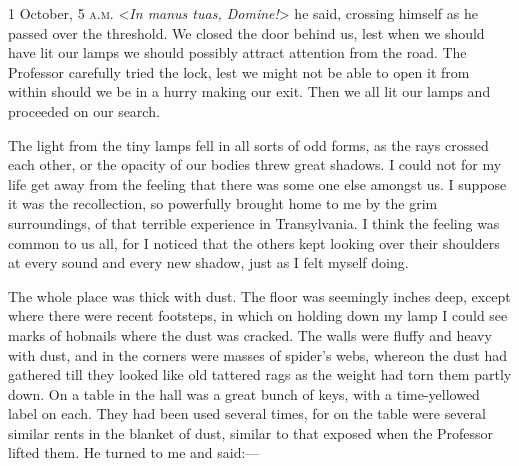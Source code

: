 \begin{diary}{1 October, 5 \textsc{a.m.}}
<\textit{In manus tuas, Domine!}> he said, crossing himself as he passed over the threshold. We closed the door behind us, lest when we should have lit our lamps we should possibly attract attention from the road. The Professor carefully tried the lock, lest we might not be able to open it from within should we be in a hurry making our exit. Then we all lit our lamps and proceeded on our search.

The light from the tiny lamps fell in all sorts of odd forms, as the rays crossed each other, or the opacity of our bodies threw great shadows. I could not for my life get away from the feeling that there was some one else amongst us. I suppose it was the recollection, so powerfully brought home to me by the grim surroundings, of that terrible experience in Transylvania. I think the feeling was common to us all, for I noticed that the others kept looking over their shoulders at every sound and every new shadow, just as I felt myself doing.

The whole place was thick with dust. The floor was seemingly inches deep, except where there were recent footsteps, in which on holding down my lamp I could see marks of hobnails where the dust was cracked. The walls were fluffy and heavy with dust, and in the corners were masses of spider's webs, whereon the dust had gathered till they looked like old tattered rags as the weight had torn them partly down. On a table in the hall was a great bunch of keys, with a time-yellowed label on each. They had been used several times, for on the table were several similar rents in the blanket of dust, similar to that exposed when the Professor lifted them. He turned to me and said:—


\end{diary}
